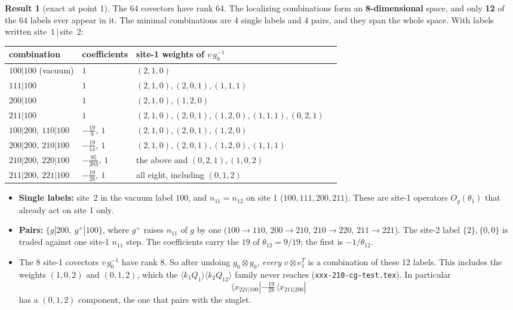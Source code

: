\documentclass[11pt]{article}
\newcommand{\nb}[1]{\texttt{#1}}
\theoremstyle{definition}
\newtheorem{result}{Result}
\theoremstyle{remark}
\begin{document}
\begin{result}[exact at point 1]\label{res:sov}
The 64 covectors have rank 64. The localizing combinations form an \textbf{8-dimensional} space, and only \textbf{12} of the 64 labels ever appear in it. The minimal combinations are 4 single labels and 4 pairs, and they span the whole space. With labels written site~1\,$|$\,site~2:
\begin{center}
\begin{tabular}{llll}\toprule
combination & coefficients & site-1 weights of $v\,g_0^{-1}$\\\midrule
$100|100$ (vacuum) & $1$ & $(2,1,0)$\\
$111|100$ & $1$ & $(2,1,0),(2,0,1),(1,1,1)$\\
$200|100$ & $1$ & $(2,1,0),(1,2,0)$\\
$211|100$ & $1$ & $(2,1,0),(2,0,1),(1,2,0),(1,1,1),(0,2,1)$\\
$100|200,\ 110|100$ & $-\tfrac{19}{9},\ 1$ & $(2,1,0),(2,0,1),(1,2,0)$\\
$200|200,\ 210|100$ & $-\tfrac{19}{14},\ 1$ & $(2,1,0),(2,0,1),(1,2,0),(1,1,1)$\\
$210|200,\ 220|100$ & $-\tfrac{95}{203},\ 1$ & the above and $(0,2,1),(1,0,2)$\\
$211|200,\ 221|100$ & $-\tfrac{19}{28},\ 1$ & all eight, including $(0,1,2)$\\\bottomrule
\end{tabular}
\end{center}
\begin{itemize}
\item \textbf{Single labels:} site~2 in the vacuum label $100$, and $n_{11}=n_{12}$ on site 1 ($100,111,200,211$). These are site-1 operators $O_g(\theta_1)$ that already act on site 1 only.
\item \textbf{Pairs:} $\{g|200,\ g^+|100\}$, where $g^+$ raises $n_{11}$ of $g$ by one ($100\to110$, $200\to210$, $210\to220$, $211\to221$). The site-2 label $\{2\},\{0,0\}$ is traded against one site-1 $n_{11}$ step. The coefficients carry the $19$ of $\theta_{12}=9/19$; the first is $-1/\theta_{12}$.
\item The 8 site-1 covectors $v\,g_0^{-1}$ have rank 8. So after undoing $g_0\otimes g_0$, \emph{every} $v\otimes e_1^T$ is a combination of these 12 labels. This includes the weights $(1,0,2)$ and $(0,1,2)$, which the $\langle k_1Q_1\rangle\langle k_2Q_{12}\rangle$ family never reaches (\nb{xxx-210-cg-test.tex}). In particular
\begin{equation}
\langle x_{221|100}|-\tfrac{19}{28}\,\langle x_{211|200}|
\end{equation}
has a $(0,1,2)$ component, the one that pairs with the singlet.
\end{itemize}
\end{result}
\end{document}
